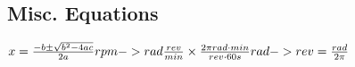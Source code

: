 \documentclass[11pt]{article}
\begin{document}
\begin{paracol}{3}
        \section*{Misc. Equations}
        \begin{fleqn}
            $
            x = \frac{-b \pm \sqrt{b^2-4ac}}{2a} \newline
            rpm -> rad \frac{rev}{min}\times \frac{2\pi rad \cdot min}{rev \cdot 60s} \newline
            rad -> rev = \frac{rad}{2\pi}
            $
        \end{fleqn}
    \end{paracol}
\end{document}
